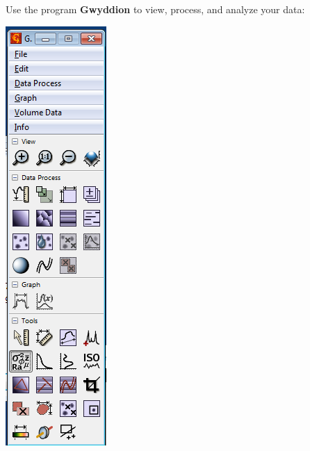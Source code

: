 \documentclass{../lab}
\begin{document}
Use the program \textbf{Gwyddion }to view, process, and analyze your data:
\begin{center}
    \href{http://experimentationlab.berkeley.edu/sites/default/files/AFMImages/39.png}{\includegraphics[width=0.5\linewidth]{images/39.png}}
\end{center}
\end{document}
